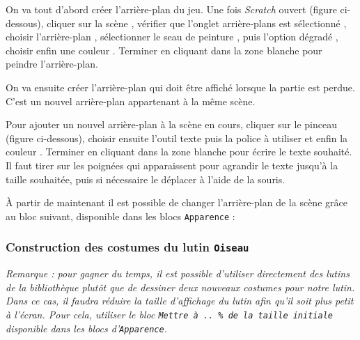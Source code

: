 On va tout d'abord créer l'arrière-plan du jeu. Une fois \emph{Scratch} ouvert (figure ci-dessous), cliquer sur la scène , vérifier que l'onglet arrière-plans est sélectionné , choisir l'arrière-plan  , sélectionner le seau de peinture , puis l'option dégradé , choisir enfin une couleur . Terminer en cliquant dans la zone blanche pour peindre l'arrière-plan.

	      
On va ensuite créer l'arrière-plan qui doit être affiché lorsque la partie est perdue. C'est un nouvel arrière-plan appartenant à la même scène.

Pour ajouter un nouvel arrière-plan à la scène en cours, cliquer sur le pinceau  (figure ci-dessous), choisir ensuite l'outil texte  puis la police à utiliser  et enfin la couleur . Terminer en cliquant dans la zone blanche pour écrire le texte souhaité. Il faut tirer sur les poignées qui apparaissent pour agrandir le texte jusqu'à la taille souhaitée, puis si nécessaire le déplacer à l'aide de la souris.




À partir de maintenant il est possible de changer l'arrière-plan de la scène grâce au bloc suivant, disponible dans les blocs \texttt{Apparence} :








\subsubsection{Construction des costumes du lutin \texttt{Oiseau}}

\emph{Remarque : pour gagner du temps, il est possible d'utiliser directement des lutins de la bibliothèque plutôt que de dessiner deux nouveaux costumes pour notre lutin. Dans ce cas, il faudra réduire la taille d'affichage du lutin afin qu'il soit plus petit à l'écran. Pour cela, utiliser le bloc \texttt{Mettre à ..\,\% de la taille initiale} disponible dans les blocs d'\texttt{Apparence}.}

\vspace{3pt}

